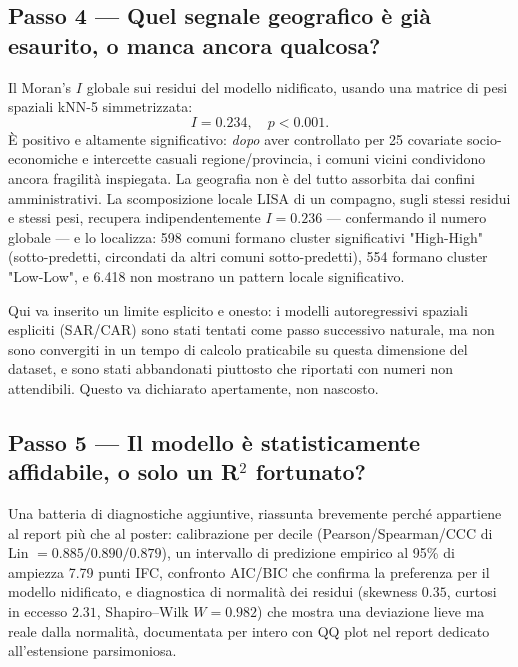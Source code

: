 \documentclass[11pt,a4paper]{article}
\begin{document}
\subsection*{Passo 4 --- Quel segnale geografico è già esaurito, o
manca ancora qualcosa?}
Il Moran's $I$ globale sui residui del modello nidificato, usando una
matrice di pesi spaziali kNN-5 simmetrizzata:
$$ I = 0.234, \quad p < 0.001. $$
È positivo e altamente significativo: \emph{dopo} aver controllato
per 25 covariate socio-economiche e intercette casuali
regione/provincia, i comuni vicini condividono ancora fragilità
inspiegata. La geografia non è del tutto assorbita dai confini
amministrativi. La scomposizione locale LISA di un compagno, sugli
stessi residui e stessi pesi, recupera indipendentemente
$I = 0.236$ --- confermando il numero globale --- e lo localizza:
598 comuni formano cluster significativi "High-High" (sotto-predetti,
circondati da altri comuni sotto-predetti), 554 formano cluster
"Low-Low", e 6{.}418 non mostrano un pattern locale significativo.

Qui va inserito un limite esplicito e onesto: i modelli
autoregressivi spaziali espliciti (SAR/CAR) sono stati tentati come
passo successivo naturale, ma non sono convergiti in un tempo di
calcolo praticabile su questa dimensione del dataset, e sono stati
abbandonati piuttosto che riportati con numeri non attendibili.
Questo va dichiarato apertamente, non nascosto.

\subsection*{Passo 5 --- Il modello è statisticamente affidabile, o
solo un R$^2$ fortunato?}
Una batteria di diagnostiche aggiuntive, riassunta brevemente perché
appartiene al report più che al poster: calibrazione per decile
(Pearson/Spearman/CCC di Lin $= 0.885/0.890/0.879$), un intervallo
di predizione empirico al 95\% di ampiezza 7.79 punti IFC, confronto
AIC/BIC che confirma la preferenza per il modello nidificato, e
diagnostica di normalità dei residui (skewness $0.35$, curtosi in
eccesso $2.31$, Shapiro--Wilk $W = 0.982$) che mostra una deviazione
lieve ma reale dalla normalità, documentata per intero con QQ plot
nel report dedicato all'estensione parsimoniosa.
\end{document}
